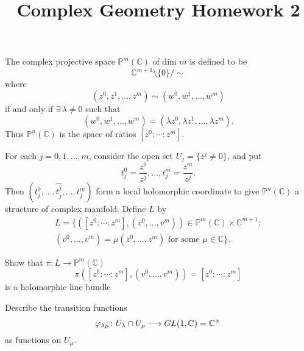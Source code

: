\documentclass[12pt]{article}
\title{Complex Geometry Homework 2}
\author{}
\date{}
\begin{document}
\maketitle
The complex projective space \(\mathbb{P}^m(\mathbb{C})\) of dim \(m\) is defined 
to be \[
    \mathbb{C}^{m+1}\setminus\{0\}/\sim
\] where \[
    (z^{0},z^{1},\ldots,z^m)\sim (w^0,w^1,\ldots,w^m)
\] if and only if \(\exists\,\lambda\neq 0\) such that \[
    (w^0,w^1,\ldots,w^m)=(\lambda z^0,\lambda z^1,\ldots,\lambda z^m)
.\] Thus \(\mathbb{P}^n(\mathbb{C})\) is the space of ratios \([z^0:\cdots :z^m]\).

For each \(j=0,1,\ldots,m\), consider the open set \(U_j=\{z^j\neq 0\}\), and put \[
    t_j^0=\frac{z^0}{z^j},\ldots,t_j^m=\frac{z^m}{z^j}
.\] Then \((t_j^0,\ldots,\hat{t_j^j},\ldots,t_j^m)\) form a local holomorphic
coordinate to give \(\mathbb{P}^n(\mathbb{C})\) a structure of complex manifold.
Define \(L\) by
\begin{align*}
    L=\Big\{\left([z^0:\cdots :z^m],(v^0,\ldots,v^m)\right)\in
        \mathbb{P}^m(\mathbb{C})\times \mathbb{C}^{m+1}: \\
        (v^0,\ldots,v^m)=\mu(z^0,\ldots,z^m)\text{ for some }\mu \in \mathbb{C}\Big\}
.\end{align*}
\begin{problem}
    Show that \(\pi\colon L\to \mathbb{P}^m(\mathbb{C})\) \[
        \pi([z^0:\cdots :z^m],(v^0,\ldots,v^m))=[z^0:\cdots :z^m]
    \] is a holomorphic line bundle
\end{problem}
\begin{problem}
    Describe the transition functions \[
        \varphi_{\lambda\mu}\colon U_\lambda\cap U_\mu\longrightarrow
        GL(1,\mathbb{C})=\mathbb{C}^\times
    \] as functions on \(U_\mu\).
\end{problem}
\end{document}
